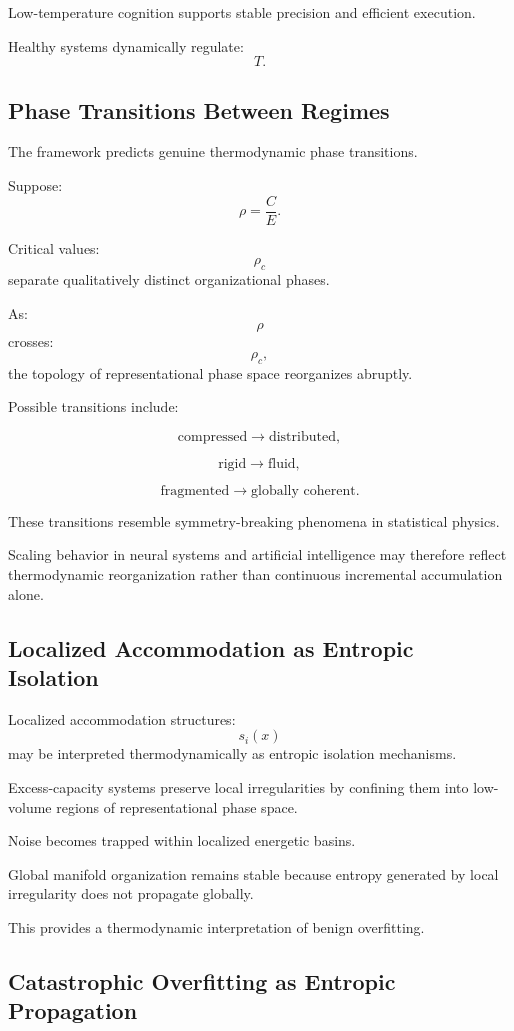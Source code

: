 \documentclass[12pt,a4paper]{article}
\begin{document}
Low-temperature cognition supports stable precision and efficient execution.

Healthy systems dynamically regulate:
\[
T.
\]

\subsection{Phase Transitions Between Regimes}

The framework predicts genuine thermodynamic phase transitions.

Suppose:
\[
\rho
=
\frac{C}{E}.
\]

Critical values:
\[
\rho_c
\]
separate qualitatively distinct organizational phases.

As:
\[
\rho
\]
crosses:
\[
\rho_c,
\]
the topology of representational phase space reorganizes abruptly.

Possible transitions include:

\[
\text{compressed}
\rightarrow
\text{distributed},
\]

\[
\text{rigid}
\rightarrow
\text{fluid},
\]

\[
\text{fragmented}
\rightarrow
\text{globally coherent}.
\]

These transitions resemble symmetry-breaking phenomena in statistical physics.

Scaling behavior in neural systems and artificial intelligence may therefore reflect thermodynamic reorganization rather than continuous incremental accumulation alone.

\subsection{Localized Accommodation as Entropic Isolation}

Localized accommodation structures:
\[
s_i(x)
\]
may be interpreted thermodynamically as entropic isolation mechanisms.

Excess-capacity systems preserve local irregularities by confining them into low-volume regions of representational phase space.

Noise becomes trapped within localized energetic basins.

Global manifold organization remains stable because entropy generated by local irregularity does not propagate globally.

This provides a thermodynamic interpretation of benign overfitting.

\subsection{Catastrophic Overfitting as Entropic Propagation}
\end{document}
